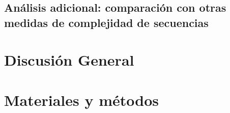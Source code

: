 \subsection{Análisis adicional: comparación con otras medidas de complejidad de secuencias}

\section{Discusión General}

\section{Materiales y métodos}

%